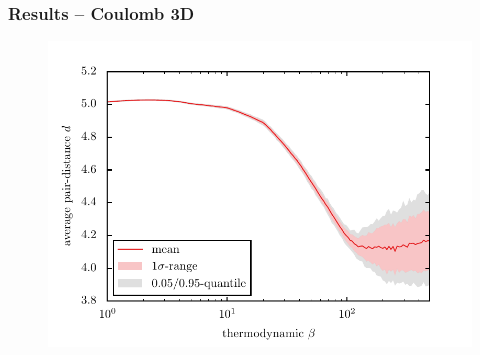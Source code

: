 \documentclass[mathserif,serif]{beamer}
\begin{document}
\begin{frame}
	\frametitle{Results -- Coulomb 3D}
	\centering	
	\begin{figure}
	\includegraphics[width=\textwidth]{../report/figures/temp_dep_coulomb3d.pdf}
	\end{figure}
\end{frame}







\end{document}
